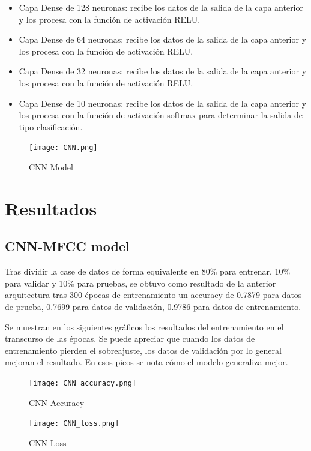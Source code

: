 \documentclass[colorinlistoftodos,twoside,twocolumn,10pt]{article} %
\begin{document}
\begin{itemize}
\item Capa Dense de 128 neuronas: recibe los datos de la salida de la capa anterior y los procesa con la función de activación RELU.

\item Capa Dense de 64 neuronas: recibe los datos de la salida de la capa anterior y los procesa con la función de activación RELU.

\item Capa Dense de 32 neuronas: recibe los datos de la salida de la capa anterior y los procesa con la función de activación RELU.

\item Capa Dense de 10 neuronas: recibe los datos de la salida de la capa anterior y los procesa con la función de activación softmax para determinar la salida de tipo clasificación.
\end{itemize}


\begin{figure}[h!] %
	\centering
	\texttt{[image: CNN.png]}
	\caption{CNN Model}
\end{figure}

\section{Resultados}
\subsection {CNN-MFCC model}
Tras dividir la case de datos de forma equivalente en 80\% para entrenar, 10\% para validar y 10\% para pruebas, se obtuvo como resultado de la anterior arquitectura tras 300 épocas de entrenamiento un accuracy de 0.7879 para datos de prueba, 0.7699 para datos de validación, 0.9786 para datos de entrenamiento.

Se muestran en los siguientes gráficos los resultados del entrenamiento en el transcurso de las épocas. Se puede apreciar que cuando los datos de entrenamiento pierden el sobreajuste, los datos de validación por lo general mejoran el resultado. En esos picos se nota cómo el modelo generaliza mejor.

\begin{figure}[h!] %
	\centering
	\texttt{[image: CNN\_accuracy.png]}
	\caption{CNN Accuracy}
\end{figure}

\begin{figure}[h!] %
	\centering
	\texttt{[image: CNN\_loss.png]}
	\caption{CNN Loss}
\end{figure}
\end{document}
